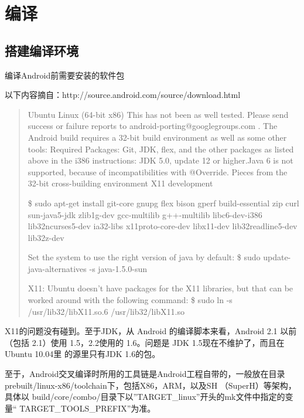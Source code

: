 \documentclass[a4paper,titlepage]{article}
\begin{document}
\section{编译}
\subsection{搭建编译环境}
编译Android前需要安装的软件包

以下内容摘自：http://source.android.com/source/download.html
\begin{quotation}
Ubuntu Linux (64-bit x86)
This has not been as well tested. Please send success or failure reports to
android-porting@googlegroups.com .  The Android build requires a 32-bit build
environment as well as some other tools: Required Packages: Git, JDK, flex,
and the other packages as listed above in the i386 instructions: JDK 5.0,
update 12 or higher.Java 6 is not supported, because of incompatibilities with
@Override.  Pieces from the 32-bit cross-building environment X11 development 

{\color{red} \$ sudo apt-get install git-core gnupg flex bison gperf build-essential zip curl sun-java5-jdk zlib1g-dev gcc-multilib g++-multilib libc6-dev-i386 lib32ncurses5-dev ia32-libs x11proto-core-dev libx11-dev lib32readline5-dev lib32z-dev
}

Set the system to use the right version of java by default: 
{\color{red} \$ sudo update-java-alternatives -s java-1.5.0-sun}

X11: Ubuntu doesn't have packages for the X11 libraries, but that can be
worked around with the following command: 
{\color{red} \$ sudo ln -s /usr/lib32/libX11.so.6 /usr/lib32/libX11.so }
\end{quotation}

X11的问题没有碰到。至于JDK，从 Android 的编译脚本来看，Android 2.1 以前（包括
2.1）使用 1.5，2.2使用的 1.6。问题是 JDK 1.5现在不维护了，而且在Ubuntu 10.04里
的源里只有JDK 1.6的包。

至于，Android交叉编译时所用的工具链是Android工程自带的，一般放在目录
prebuilt/linux-x86/toolchain下，包括X86，ARM，以及SH （SuperH）等架构，具体以
build/core/combo/目录下以”TARGET_linux”开头的mk文件中指定的变量“
TARGET_TOOLS_PREFIX”为准。
\end{document}
